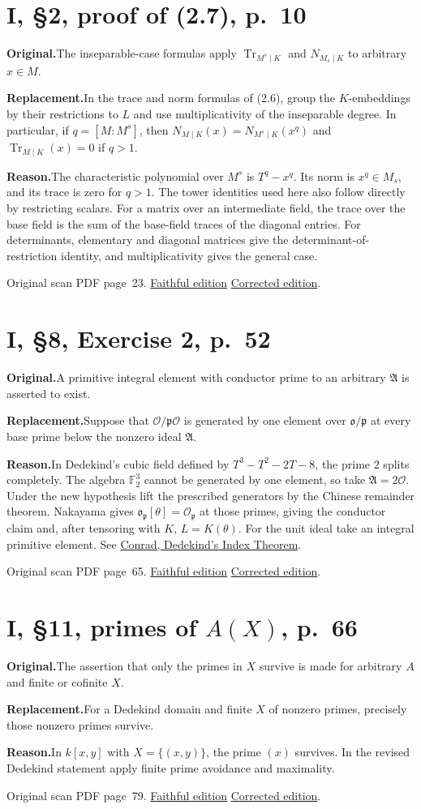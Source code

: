 \documentclass[11pt,a4paper]{article}
\newcommand{\original}{\par\smallskip\noindent\textbf{Original.}\enspace}
\newcommand{\replacement}{\par\smallskip\noindent\textbf{Replacement.}\enspace}
\newcommand{\reason}{\par\smallskip\noindent\textbf{Reason.}\enspace}
\newcommand{\editionlink}[3]{\href{#1\#errata.#2}{#3}}
\newcommand{\location}[2]{%
  \par\smallskip\noindent Original scan PDF page~#2.\enspace
  \editionlink{Neukirch_Faithful.pdf}{#1}{Faithful edition}
  \quad\editionlink{Neukirch_Corrected.pdf}{#1}{Corrected edition}.}
\begin{document}
\section{I, \S2, proof of (2.7), p.~10}\label{errata:item:6}
\original The inseparable-case formulas apply $\operatorname{Tr}_{M^s\mid K}$ and $N_{M_s\mid K}$ to arbitrary $x\in M$.
\replacement In the trace and norm formulas of (2.6), group the $K$-embeddings by their restrictions to $L$ and use multiplicativity of the inseparable degree. In particular, if $q=[M:M^s]$, then $N_{M\mid K}(x)=N_{M^s\mid K}(x^q)$ and $\operatorname{Tr}_{M\mid K}(x)=0$ if $q>1$.
\reason The characteristic polynomial over $M^s$ is $T^q-x^q$. Its norm is $x^q\in M_s$, and its trace is zero for $q>1$. The tower identities used here also follow directly by restricting scalars. For a matrix over an intermediate field, the trace over the base field is the sum of the base-field traces of the diagonal entries. For determinants, elementary and diagonal matrices give the determinant-of-restriction identity, and multiplicativity gives the general case.
\location{6}{23}

\setcounter{section}{6}
\section{I, \S8, Exercise 2, p.~52}\label{errata:item:7}
\original A primitive integral element with conductor prime to an arbitrary $\mathfrak A$ is asserted to exist.
\replacement Suppose that $\mathcal O/\mathfrak p\mathcal O$ is generated by one element over $\mathfrak o/\mathfrak p$ at every base prime below the nonzero ideal $\mathfrak A$.
\reason In Dedekind\textquoteright{}s cubic field defined by $T^3-T^2-2T-8$, the prime $2$ splits completely. The algebra $\mathbb F_2^3$ cannot be generated by one element, so take $\mathfrak A=2\mathcal O$. Under the new hypothesis lift the prescribed generators by the Chinese remainder theorem. Nakayama gives $\mathfrak o_{\mathfrak p}[\theta]=\mathcal O_{\mathfrak p}$ at those primes, giving the conductor claim and, after tensoring with $K$, $L=K(\theta)$. For the unit ideal take an integral primitive element. See \href{https://kconrad.math.uconn.edu/blurbs/gradnumthy/dedekind-index-thm.pdf}{Conrad, Dedekind\textquoteright{}s Index Theorem}.
\location{7}{65}

\setcounter{section}{7}
\section{I, \S11, primes of $A(X)$, p.~66}\label{errata:item:8}
\original The assertion that only the primes in $X$ survive is made for arbitrary $A$ and finite or cofinite $X$.
\replacement For a Dedekind domain and finite $X$ of nonzero primes, precisely those nonzero primes survive.
\reason In $k[x,y]$ with $X=\{(x,y)\}$, the prime $(x)$ survives. In the revised Dedekind statement apply finite prime avoidance and maximality.
\location{8}{79}
\end{document}

